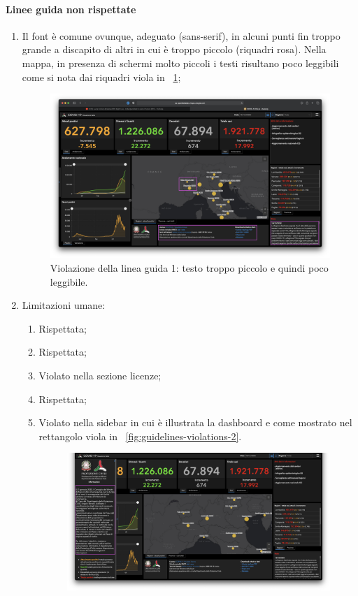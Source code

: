 \paragraph{Linee guida non rispettate}
\begin{enumerate}
    \item Il font è comune ovunque, adeguato (sans-serif), in alcuni punti fin troppo grande a discapito di altri in cui è troppo piccolo (riquadri rosa). Nella mappa, in presenza di schermi molto piccoli i testi risultano poco leggibili come si nota dai riquadri viola in ~\ref{fig:guidelines-violations-1};
        \begin{figure}[h]
        \centering
        \includegraphics[width=0.5\columnwidth]{../../../assets/images/verifica-risorse-esistenti/guidelines_violations_1.png}
        \caption{Violazione della linea guida 1: testo troppo piccolo e quindi poco leggibile.}
        \label{fig:guidelines-violations-1}
    \end{figure}
    \item Limitazioni umane:
        \begin{enumerate}
                \item Rispettata;
                \item Rispettata;
                \item Violato nella sezione licenze;
                \item Rispettata;
                \item Violato nella sidebar in cui è illustrata la dashboard e come mostrato nel rettangolo viola in ~\ref{fig:guidelines-violations-2}.
                    \begin{figure}[h]
                    \centering
                    \includegraphics[width=0.5\columnwidth]{../../../assets/images/verifica-risorse-esistenti/guidelines_violations_2.png}

\end{figure}
\end{enumerate}
\end{enumerate}
